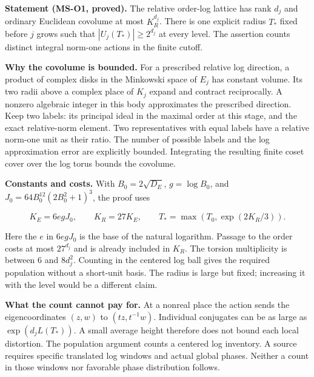 \documentclass[12pt,a4paper]{article}
\newcommand{\headone}[1]{\vspace{6pt}{\raggedright\hyphenpenalty=10000\fontsize{22}{25}\selectfont\bfseries #1\par}\vspace{3pt}}
\begin{document}
\label{sec:the-unit-population-theorem}\headone{The unit population theorem}

\textbf{Statement (MS-O1, proved).} The relative order-log lattice has rank $d_j$ and ordinary Euclidean covolume at most $K_R^{d_j}$. There is one explicit radius $T_*$ fixed before $j$ grows such that $|U_j(T_*)|\ge2^{d_j}$ at every level. The assertion counts distinct integral norm-one actions in the finite cutoff.\par

\textbf{Why the covolume is bounded.} For a prescribed relative log direction, a product of complex disks in the Minkowski space of $E_j$ has constant volume. Its two radii above a complex place of $K_j$ expand and contract reciprocally. A nonzero algebraic integer in this body approximates the prescribed direction. Keep two labels: its principal ideal in the maximal order at this stage, and the exact relative-norm element. Two representatives with equal labels have a relative norm-one unit as their ratio. The number of possible labels and the log approximation error are explicitly bounded. Integrating the resulting finite coset cover over the log torus bounds the covolume.\par

\textbf{Constants and costs.} With $B_0=2\sqrt{D_E}$, $g=\log B_0$, and $J_0=64B_0^{12}(2B_0^2+1)^3$, the proof uses\par

\begin{equation*}\tag*{}\label{eq:the-unit-population-theorem-1}
K_E=6egJ_0,\qquad K_R=27K_E,\qquad T_*=\max(T_0,\exp(2K_R/3)).
\end{equation*}

Here the $e$ in $6egJ_0$ is the base of the natural logarithm. Passage to the order costs at most $27^{d_j}$ and is already included in $K_R$. The torsion multiplicity is between 6 and $8d_j^2$. Counting in the centered log ball gives the required population without a short-unit basis. The radius is large but fixed; increasing it with the level would be a different claim.\par

\textbf{What the count cannot pay for.} At a nonreal place the action sends the eigencoordinates $(z,w)$ to $(tz,t^{-1}w)$. Individual conjugates can be as large as $\exp(d_j L(T_*))$. A small average height therefore does not bound each local distortion. The population argument counts a centered log inventory. A source requires specific translated log windows and actual global phases. Neither a count in those windows nor favorable phase distribution follows.\par
\end{document}
